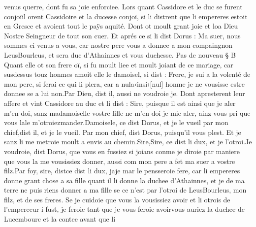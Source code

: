 \documentclass{article}
\begin{document}
\begin{pages}
               venus querre, dont fu sa joie enforciee. Lors quant 
               Cassidore et le duc 
                  se furent conjoïil orent Cassidoire et la ducesse conjoï, si li distrent que 
               li empereres estoit en 
                  Gresce et avoient tout le paÿs aquité. 
               Dont ot moult grant joie et loa Dieu Nostre Seingneur de tout son cuer. 
               Et aprés ce si li dist Dorus :
               Ma suer, 
                  nous sommes ci venus a vous, car nostre pere vous a donnee a mon compaingnon 
                  LeusBourleus, 
               et sera duc d’Athainnes et vous duchesse. \pend
            \pstart Pas de nouveau § B
               Quant elle ot son frere oï, 
               si fu moult liee 
               et
               moult joiant de ce mariage, car 
               susdessus touz honmes amoit 
               elle le damoisel, si dist :
               Frere, je sui a la volenté de mon pere, 
                  si ferai ce qui li plera, car a nula‹insi›[nul] 
                  honme je 
                  ne vousisse estre donnee se a lui non.Par Dieu, dist il, aussi ne voudroie je.
               Dont apresterent leur affere et vint Cassidore au 
               duc et li dist :
               Sire, puisque il est ainsi que je aler m’en doi, sanz madamoiselle vostre fille ne m’en doi je mie aler, 
                  ainz vous pri que vous lale 
                  m'otroiezmander.Damoisele, 
                  ce dist Dorus, et je le vueil 
                     par mon chief,dist il, et je le vueil. Par mon chief, dist Dorus, 
                  puisqu’il vous plest. 
                  Et je sanz li me metroie moult a envis au chemin.Sire,Sire, ce 
                  dist li dux, 
                  et je l’otroi.Je voudroie, dist Dorus, que vous en fussiez si joians 
               conme je diroie par maniere que vous la me vousissiez donner, aussi com mon pere 
                  a fet ma suer a vostre filz.Par foy, sire, distce dist 
                  li dux, jaje 
                  mar le pensseroie fere, car li empereres donne grant chose a 
                  sa fille quant il li donne la duchee d’Athainnes,
                  et je de ma terre ne puis riens donner a ma fille se ce n’est par l’otroi de 
                  LeusBourleus, 
                  mon filz, et de ses freres. Se je cuidoie que vous la vousissiez avoir 
                  et li otrois de l’empereeur i fust, je feroie tant que 
                  je vous feroie avoirvous auriez la duchee 
                  de Lucembourc et la contee avant que li 

\end{pages}
\end{document}
